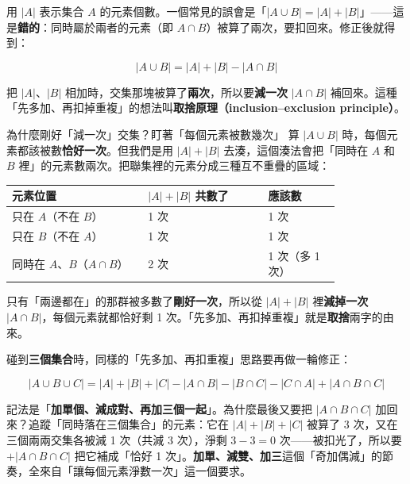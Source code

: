 \documentclass[11pt]{article}
\begin{document}
用 $|A|$ 表示集合 $A$ 的元素個數。一個常見的誤會是「$|A\cup B|=|A|+|B|$」——這是\textbf{錯的}：同時屬於兩者的元素（即 $A\cap B$）被算了兩次，要扣回來。修正後就得到：

$$\boxed{\,|A\cup B| = |A| + |B| - |A\cap B|\,}$$

把 $|A|$、$|B|$ 相加時，交集那塊被算了\textbf{兩次}，所以要\textbf{減一次} $|A\cap B|$ 補回來。這種「先多加、再扣掉重複」的想法叫\textbf{取捨原理（inclusion–exclusion principle）}。

\begin{補充框}{為什麼剛好「減一次」交集？盯著「每個元素被數幾次」}
算 $|A\cup B|$ 時，每個元素都該被數\textbf{恰好一次}。但我們是用 $|A|+|B|$ 去湊，這個湊法會把「同時在 $A$ 和 $B$ 裡」的元素數兩次。把聯集裡的元素分成三種互不重疊的區域：

\begin{center}
\renewcommand{\arraystretch}{1.3}
\begin{tabular}{p{0.34\linewidth} p{0.30\linewidth} p{0.18\linewidth}}
\hline
\textbf{元素位置} & \textbf{$|A|+|B|$ 共數了} & \textbf{應該數} \\
\hline
只在 $A$（不在 $B$） & 1 次 & 1 次 \\
只在 $B$（不在 $A$） & 1 次 & 1 次 \\
同時在 $A$、$B$（$A\cap B$） & 2 次 & 1 次（多 1 次） \\
\hline
\end{tabular}
\end{center}

只有「兩邊都在」的那群被多數了\textbf{剛好一次}，所以從 $|A|+|B|$ 裡\textbf{減掉一次} $|A\cap B|$，每個元素就都恰好剩 1 次。「先多加、再扣掉重複」就是\textbf{取捨}兩字的由來。
\end{補充框}

碰到\textbf{三個集合}時，同樣的「先多加、再扣重複」思路要再做一輪修正：

$$\boxed{\,|A\cup B\cup C| = |A|+|B|+|C| - |A\cap B| - |B\cap C| - |C\cap A| + |A\cap B\cap C|\,}$$

記法是「\textbf{加單個、減成對、再加三個一起}」。為什麼最後又要把 $|A\cap B\cap C|$ 加回來？追蹤「同時落在三個集合」的元素：它在 $|A|+|B|+|C|$ 被算了 3 次，又在三個兩兩交集各被減 1 次（共減 3 次），淨剩 $3-3=0$ 次——被扣光了，所以要 $+|A\cap B\cap C|$ 把它補成「恰好 1 次」。\textbf{加單、減雙、加三}這個「奇加偶減」的節奏，全來自「讓每個元素淨數一次」這一個要求。

\end{document}
